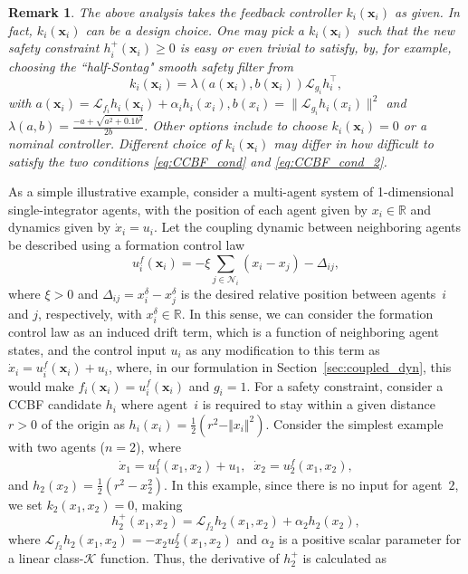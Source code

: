 \documentclass[letterpaper, 10 pt, conference]{ieeeconf}  %
\theoremstyle{plain}
\newtheorem{remark}{Remark}
\begin{document}
\begin{remark}\label{rem:k_i}
The above analysis takes the feedback controller $k_i(\mathbf{x}_i)$ as given. In fact,  $k_i(\mathbf{x}_i)$ can be a design choice.
One may pick a $k_i(\mathbf{x}_i)$ such that the new safety constraint $h_i^+ (\mathbf{x}_i) \geq 0$ is easy or even trivial to satisfy, by, for example, choosing the ``half-Sontag" smooth safety filter from \cite{cohen2023characterizing} 
$$k_i(\mathbf{x}_i)=  \lambda(a(\mathbf{x}_i) , b(\mathbf{x}_i)) \mathcal{L}_{g_i} h_i^{\top}, $$ with  $a(\mathbf{x}_i) =  \mathcal{L}_{f_i}h_i(\mathbf{x}_i) + \alpha_i h_i(x_i), b(x_i)= \| \mathcal{L}_{g_i}h_i(x_i)\|^2$ and 
$ \lambda(a,b) =   \frac{-a + \sqrt{a^2 + 0.1b^2}}{2b}.$ Other options include to choose $k_i(\mathbf{x}_i)= 0$ or a nominal controller. Different choice of $k_i(\mathbf{x}_i)$ may differ in how difficult to satisfy the two conditions  \eqref{eq:CCBF_cond} and \eqref{eq:CCBF_cond_2}.
\end{remark}


As a simple illustrative example, consider a multi-agent system of 1-dimensional single-integrator agents, with the position of each agent given by $x_i \in \mathbb{R}$ and dynamics given by $\dot{x}_i = u_i$.
Let the coupling dynamic between neighboring agents be described using a formation control law
\begin{equation}\label{eq:u_f_i}
    u^f_i(\mathbf{x}_i) = -\xi \sum_{j \in \mathcal{N}_i} (x_i - x_j)  - \Delta_{ij}, 
\end{equation}
where $\xi>0$ and $\Delta_{ij} = x_i^\delta - x_j^\delta$ is the desired relative position between agents~$i$ and $j$, respectively, with $x_i^\delta \in \mathbb{R}$. In this sense, we can consider the formation control law as an induced drift term, which is a function of neighboring agent states, and the control input $u_i$ as any modification to this term as $\dot{x}_i =  u^f_i(\mathbf{x}_i) + u_i$, where, in our formulation in Section~\ref{sec:coupled_dyn}, this would make $f_i(\mathbf{x}_i) = u^f_i(\mathbf{x}_i)$ and $g_i = 1$.
%
For a safety constraint, consider a CCBF candidate $h_i$ where agent~$i$ is required to stay within a given distance $r > 0$ of the origin as $h_i(x_i) = \frac{1}{2}\left(r^2 - \Vert x_i \Vert^2\right).$
Consider the simplest example with two agents ($n=2$), where
\begin{equation} \label{eq:2agent_1D_dyn}
    \begin{aligned}
        \dot{x}_1 = u^f_1(x_1, x_2) + u_1, \;\; \dot{x}_2 = u^f_2(x_1, x_2),
    \end{aligned}
\end{equation}
and $h_2(x_2) = \frac{1}{2}\left(r^2 - x_2^2\right)$. In this example, since there is no input for agent~$2$, we set $k_2(x_1, x_2) = 0$, making
\begin{equation} \label{eq:h_2_plus_1D_ex}
    h_2^+(x_1, x_2) = \mathcal{L}_{f_2}h_2(x_1, x_2) + \alpha_2 h_2(x_2),
\end{equation}
where $\mathcal{L}_{f_2}h_2(x_1, x_2) = - x_2 u^f_2(x_1, x_2)$
and $\alpha_2$ is a positive scalar parameter for a linear class-$\mathcal{K}$ function. Thus, the derivative of $h_2^+$ is calculated as
\end{document}
